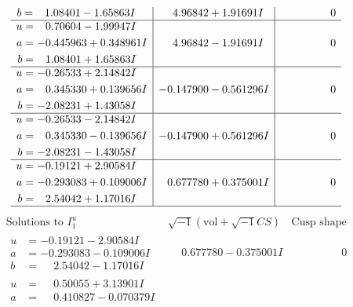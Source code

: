 \documentclass[1p]{elsarticle_modified}
\theoremstyle{definition}
\newcommand{\I}{\sqrt{-1}}
\begin{document}
$$\begin{array}{c|c|c}
\begin{aligned}
b &= \phantom{-}1.08401 - 1.65863 I\end{aligned}
 & \phantom{-}4.96842 + 1.91691 I & \phantom{-0.000000 } 0 \\ \hline\begin{aligned}
u &= \phantom{-}0.70604 - 1.99947 I \\
a &= -0.445963 + 0.348961 I \\
b &= \phantom{-}1.08401 + 1.65863 I\end{aligned}
 & \phantom{-}4.96842 - 1.91691 I & \phantom{-0.000000 } 0 \\ \hline\begin{aligned}
u &= -0.26533 + 2.14842 I \\
a &= \phantom{-}0.345330 + 0.139656 I \\
b &= -2.08231 + 1.43058 I\end{aligned}
 & -0.147900 - 0.561296 I & \phantom{-0.000000 } 0 \\ \hline\begin{aligned}
u &= -0.26533 - 2.14842 I \\
a &= \phantom{-}0.345330 - 0.139656 I \\
b &= -2.08231 - 1.43058 I\end{aligned}
 & -0.147900 + 0.561296 I & \phantom{-0.000000 } 0 \\ \hline\begin{aligned}
u &= -0.19121 + 2.90584 I \\
a &= -0.293083 + 0.109006 I \\
b &= \phantom{-}2.54042 + 1.17016 I\end{aligned}
 & \phantom{-}0.677780 + 0.375001 I & \phantom{-0.000000 } 0\\
 \hline 
 \end{array}$$\newpage$$\begin{array}{c|c|c}  
\text{Solutions to }I^u_{1}& \I (\text{vol} + \sqrt{-1}CS) & \text{Cusp shape}\\
 \hline 
\begin{aligned}
u &= -0.19121 - 2.90584 I \\
a &= -0.293083 - 0.109006 I \\
b &= \phantom{-}2.54042 - 1.17016 I\end{aligned}
 & \phantom{-}0.677780 - 0.375001 I & \phantom{-0.000000 } 0 \\ \hline\begin{aligned}
u &= \phantom{-}0.50055 + 3.13901 I \\
a &= \phantom{-}0.410827 - 0.070379 I \\

\end{aligned}
\end{array}$$
\end{document}
